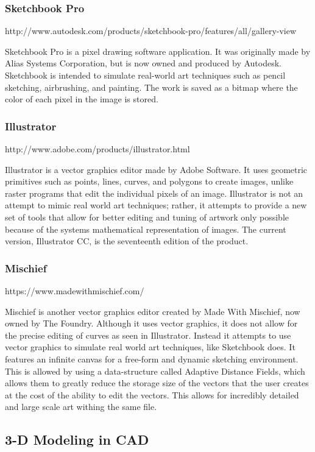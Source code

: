 \documentclass[12pt]{article}
\begin{document}
\subsubsection{Sketchbook Pro} http://www.autodesk.com/products/sketchbook-pro/features/all/gallery-view

Sketchbook Pro is a pixel drawing software application. It was originally made by Alias Systems Corporation, but is now owned and produced by Autodesk. Sketchbook is intended to simulate real-world art techniques such as pencil sketching, airbrushing, and painting. The work is saved as a bitmap where the color of each pixel in the image is stored. 

\subsubsection{Illustrator} http://www.adobe.com/products/illustrator.html

Illustrator is a vector graphics editor made by Adobe Software. It uses geometric primitives such as points, lines, curves, and polygons to create images, unlike raster programs that edit the individual pixels of an image. Illustrator is not an attempt to mimic real world art techniques; rather, it attempts to provide a new set of tools that allow for better editing and tuning of artwork only possible because of the systems mathematical representation of images. The current version, Illustrator CC, is the seventeenth edition of the product.

\subsubsection{Mischief} https://www.madewithmischief.com/

Mischief is another vector graphics editor created by Made With Mischief, now owned by The Foundry. Although it uses vector graphics, it does not allow for the precise editing of curves as seen in Illustrator. Instead it attempts to use vector graphics to simulate real world art techniques, like Sketchbook does. It features an infinite canvas for a free-form and dynamic sketching environment. This is allowed by using a data-structure called Adaptive Distance Fields, which allows them to greatly reduce the storage size of the vectors that the user creates at the cost of the ability to edit the vectors. This allows for incredibly detailed and large scale art withing the same file.


\subsection{3-D Modeling in CAD}
\end{document}
